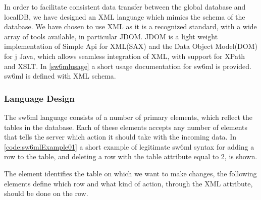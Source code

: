 In order to facilitate consistent data transfer between the global database and localDB, we have designed an XML language which mimics
the schema of the database. We have chosen to use XML as it is a recognized standard, with a wide array of tools available, in particular JDOM\cite{www.jdom.org}.
JDOM is a light weight implementation of Simple Api for XML(SAX)\cite{SAX} and the Data Object Model(DOM) for j
Java, which allows seamless integration of XML, with support for XPath and XSLT.
In \autoref{sw6mlusage} a short usage documentation for sw6ml is provided. sw6ml is defined with XML schema.

\subsubsection{Language Design}

The sw6ml language consists of a number of primary elements, which reflect the tables in the database. Each of these elements accepts any number of  elements that tells
the server which action it should take with the incoming data.
In \autoref{code:sw6mlExample01} a short example of legitimate sw6ml syntax for adding a row to the  table, and deleting a row with the  table attribute equal to 2, is shown.

The  element identifies the table on which we want to make changes, the following  elements
define which row and what kind of action, through the  XML attribute, should be done on the row. 

